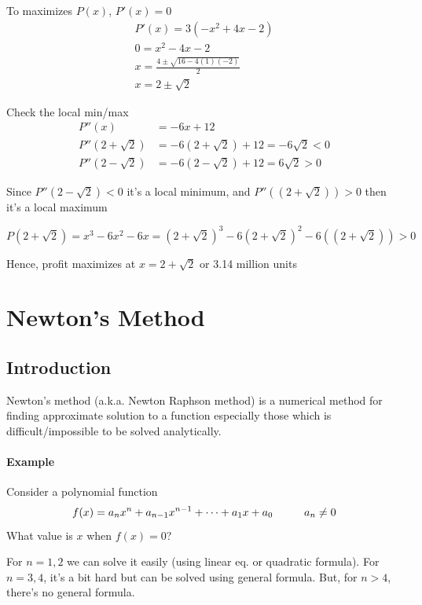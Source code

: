 \documentclass[12pt]{article}
\newcommand\tab[1][1cm]{\hspace*{#1}}
\begin{document}
To maximizes $P(x)$, $P'(x) = 0$
\begin{align*} 
    P'(x) = 3(- x^2 + 4x - 2) \\
    0 = x^2 - 4x - 2 \\
    x = \frac{4 \pm \sqrt{16 - 4(1)( - 2)}}{2} \\
    x = 2 \pm \sqrt{2} 
\end{align*}

Check the local min/max
\begin{align*} 
     P''(x) &= - 6x + 12 \\
     P''(2 + \sqrt{2}) &= - 6(2 + \sqrt{2}) + 12 = - 6 \sqrt{2} < 0 \\
     P''(2 - \sqrt{2}) &= - 6(2 - \sqrt{2}) + 12 = 6 \sqrt{2} > 0
\end{align*}

Since $P''(2 - \sqrt{2}) < 0$ it's a local minimum, and $P''((2 + \sqrt{2})) > 0$ then it's a local maximum

\[
    P(2 + \sqrt{2}) = x^3 - 6x^2 - 6x = (2 + \sqrt{2})^3 - 6(2 + \sqrt{2})^2 - 6((2 + \sqrt{2}))  > 0
\]

Hence, profit maximizes at $x = 2 + \sqrt{2}$ or 3.14 million units

\section{Newton's Method}
\subsection{Introduction}
Newton's method (a.k.a. Newton Raphson method) is a numerical method for finding approximate solution to a function especially those which is difficult/impossible
to be solved analytically.

\paragraph{Example} Consider a polynomial function
\[
    f(x) = a_n x^n + a_{n - 1}x^{n - 1} + \dots + a_1 x + a_0 \textrm{\tab} a_n \neq 0
\]
What value is $x$ when $f(x) = 0$?

For $n = {1, 2}$ we can solve it easily (using linear eq. or quadratic formula). For $n = {3, 4}$, it's a bit hard but can be solved using
general formula. But, for $n > 4$, there's no general formula.
\end{document}
